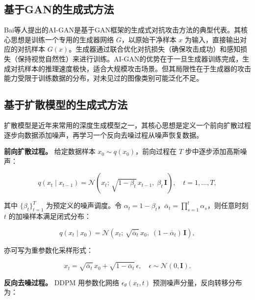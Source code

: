 \documentclass[type=bachelor,oneside]{fduthesis}
\begin{document}
\subsection{基于GAN的生成式方法}

Bai等人\cite{bai2021aigan}提出的AI-GAN是基于GAN框架的生成式对抗攻击方法的典型代表。其核心思想是训练一个专用的生成器网络 $G$，以原始干净样本 $x$ 为输入，直接输出对应的对抗样本 $G(x)$。生成器通过联合优化对抗损失（确保攻击成功）和感知损失（保持视觉自然性）来进行训练。AI-GAN的优势在于一旦生成器训练完成，生成对抗样本的推理速度极快，适合大规模攻击场景。但其局限性在于生成器的攻击能力受限于训练数据的分布，对未见过的图像类别可能泛化不足。

\subsection{基于扩散模型的生成式方法}

扩散模型\cite{ho2020denoising}是近年来常用的深度生成模型之一，其核心思想是定义一个前向扩散过程逐步向数据添加噪声，再学习一个反向去噪过程从噪声恢复数据。

\textbf{前向扩散过程。} 给定数据样本 $x_0 \sim q(x_0)$，前向过程在 $T$ 步中逐步添加高斯噪声：

\begin{equation}
  q(x_t \mid x_{t-1}) = \mathcal{N}\!\left(x_t;\, \sqrt{1-\beta_t}\, x_{t-1},\; \beta_t\, \mathbf{I}\right), \quad t=1,\ldots,T,
  \label{eq:ddpm_forward_step}
\end{equation}

其中 $\{\beta_t\}_{t=1}^T$ 为预定义的噪声调度。令 $\alpha_t=1-\beta_t$，$\bar{\alpha}_t=\prod_{s=1}^{t}\alpha_s$，则任意时刻 $t$ 的加噪样本满足闭式分布：

\begin{equation}
  q(x_t \mid x_0) = \mathcal{N}\!\left(x_t;\, \sqrt{\bar{\alpha}_t}\, x_0,\; (1-\bar{\alpha}_t)\, \mathbf{I}\right),
  \label{eq:ddpm_forward_closed}
\end{equation}

亦可写为重参数化采样形式：

\begin{equation}
  x_t = \sqrt{\bar{\alpha}_t}\, x_0 + \sqrt{1-\bar{\alpha}_t}\, \epsilon, \quad \epsilon\sim\mathcal{N}(0,\mathbf{I}).
  \label{eq:ddpm_forward_reparam}
\end{equation}

\textbf{反向去噪过程。} DDPM 用参数化网络 $\epsilon_\theta(x_t,t)$ 预测噪声分量，反向转移分布为：
\end{document}
